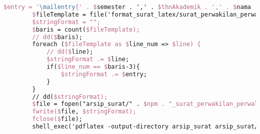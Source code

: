 \begin{lstlisting}[language=tex,basicstyle=\tiny,caption=HistorysuratController.php]
        $entry = '\mailentry{' . $semester . ',' . $thnAkademik . ',' . $nama . ',' . $prodi . ',' . $npm . ',' . $namaWakil . ',' . $prodiWakil . ',' . $npmWakil . ',' . $dosenWali . ',' . $alasan . ',' . $kodeMK1 . ',' . $matkul1 . ',' . $sks1 . ',' . $kodeMK2 . ',' . $matkul2 . ',' . $sks2 . ',' . $kodeMK3 . ',' . $matkul3 . ',' . $sks3 . ',' . $kodeMK4 . ',' . $matkul4 . ',' . $sks4 . ',' . $kodeMK5 . ',' . $matkul5 . ',' . $sks5 . ',' . $kodeMK6 . ',' . $matkul6 . ',' . $sks6 . ',' . $kodeMK7 . ',' . $matkul7 . ',' . $sks7 . ',' . $kodeMK8 . ',' . $matkul8 . ',' . $sks8 . ',' . $kodeMK9 . ',' . $matkul9 . ',' . $sks9 . ',' . $tanggal . '}';
        $fileTemplate = file('format_surat_latex/surat_perwakilan_perwalian_9mk.tex');
        $stringFormat = "";
        $baris = count($fileTemplate);
        // dd($baris);
        foreach ($fileTemplate as $line_num => $line) {
            // dd($line);
            $stringFormat .= $line;
            if($line_num == $baris-3){
                $stringFormat .= $entry;
            }
        }
        // dd($stringFormat);
        $file = fopen("arsip_surat/" . $npm . "_surat_perwakilan_perwalian_9mk.tex", "w");
        fwrite($file, $stringFormat);
        fclose($file);
        shell_exec('pdflatex -output-directory arsip_surat arsip_surat/' . $npm . '_surat_perwakilan_perwalian_9mk.tex');


\end{lstlisting}
